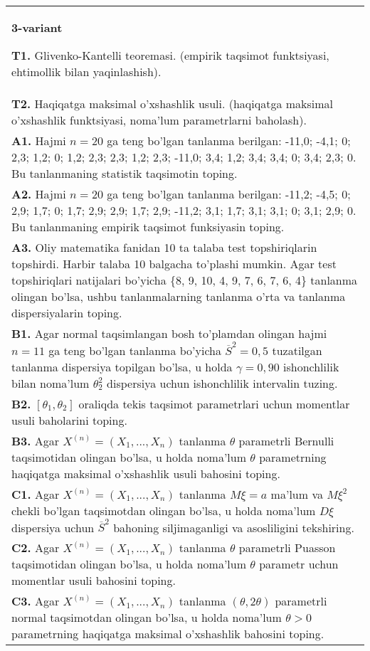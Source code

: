 \documentclass{article}
\begin{document}
\begin{tabular}{m{17cm}}
\textbf{3-variant}
\newline

\textbf{T1.} 
Glivenko-Kantelli teoremasi. (empirik taqsimot funktsiyasi, ehtimollik bilan yaqinlashish).
\\
\textbf{T2.} 
Haqiqatga maksimal o'xshashlik usuli. (haqiqatga maksimal o'xshashlik funktsiyasi, noma'lum parametrlarni baholash).
\\
\textbf{A1.} 
Hajmi \(n = 20\) ga teng bo'lgan tanlanma berilgan: -11,0; -4,1; 0; 2,3; 1,2; 0; 1,2; 2,3; 2,3; 1,2; 2,3; -11,0; 3,4; 1,2; 3,4; 3,4; 0; 3,4; 2,3; 0. Bu tanlanmaning statistik taqsimotin toping.
\\
\textbf{A2.} 
Hajmi \(n = 20\) ga teng bo'lgan tanlanma berilgan: -11,2; -4,5; 0; 2,9; 1,7; 0; 1,7; 2,9; 2,9; 1,7; 2,9; -11,2; 3,1; 1,7; 3,1; 3,1; 0; 3,1; 2,9; 0. Bu tanlanmaning empirik taqsimot funksiyasin toping.
\\
\textbf{A3.} 
Oliy matematika fanidan 10 ta talaba test topshiriqlarin topshirdi. Harbir talaba 10 balgacha to'plashi mumkin. Agar test topshiriqlari natijalari bo'yicha \{8, 9, 10, 4, 9, 7, 6, 7, 6, 4\} tanlanma olingan bo'lsa, ushbu tanlanmalarning tanlanma o'rta va tanlanma dispersiyalarin toping.
\\
\textbf{B1.} 
Agar normal taqsimlangan bosh to'plamdan olingan hajmi \(n = 11\) ga teng bo'lgan tanlanma bo'yicha \({\overline{S}}^{2} = 0,5\) tuzatilgan tanlanma dispersiya topilgan bo'lsa, u holda \(\gamma = 0,90\) ishonchlilik bilan noma'lum \(\theta_{2}^{2}\) dispersiya uchun ishonchlilik intervalin tuzing.
\\
\textbf{B2.} 
\(\left\lbrack \theta_{1},\theta_{2} \right\rbrack\) oraliqda tekis taqsimot parametrlari uchun momentlar usuli baholarini toping.
\\
\textbf{B3.} 
Agar \(X^{(n)} = \left( X_{1},...,X_{n} \right)\) tanlanma \(\theta\) parametrli Bernulli taqsimotidan olingan bo'lsa, u holda noma'lum \(\theta\) parametrning haqiqatga maksimal o'xshashlik usuli bahosini toping.
\\
\textbf{C1.} 
Agar \(X^{(n)} = \left( X_{1},...,X_{n} \right)\) tanlanma \(M\xi = a\) ma'lum va \(M\xi^{2}\) chekli bo'lgan taqsimotdan olingan bo'lsa, u holda noma'lum \(D\xi\) dispersiya uchun \({\overline{S}}^{2}\) bahoning siljimaganligi va asosliligini tekshiring.
\\
\textbf{C2.} 
Agar \(X^{(n)} = \left( X_{1},...,X_{n} \right)\) tanlanma \(\theta\) parametrli Puasson taqsimotidan olingan bo'lsa, u holda noma'lum \(\theta\) parametr uchun momentlar usuli bahosini toping.
\\
\textbf{C3.} 
Agar \(X^{(n)} = \left( X_{1},...,X_{n} \right)\) tanlanma \((\theta,2\theta)\) parametrli normal taqsimotdan olingan bo'lsa, u holda noma'lum \(\theta > 0\) parametrning haqiqatga maksimal o'xshashlik bahosini toping.
\\

\end{tabular}
\vspace{1cm}
\end{document}
